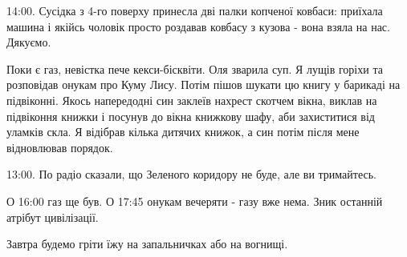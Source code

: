 14:00. Сусідка з 4-го поверху принесла дві палки копченої ковбаси: приїхала
машина і якійсь чоловік просто роздавав ковбасу з кузова - вона взяла на нас.
Дякуємо.

Поки є газ, невістка пече кекси-бісквіти. Оля зварила суп. Я лущів горіхи та
розповідав онукам про Куму Лису. Потім пішов шукати цю книгу у барикаді на
підвіконні. Якось напередодні син заклеїв нахрест скотчем вікна, виклав на
підвіконня книжки і посунув до вікна книжкову шафу, аби захиститися від уламків
скла. Я відібрав кілька дитячих книжок, а син потім після мене відновлював
порядок.

13:00. По радіо сказали, що Зеленого коридору не буде, але ви тримайтесь.

О 16:00 газ ще був. О 17:45 онукам вечеряти - газу вже нема. Зник останній
атрібут цивілізації.

Завтра будемо гріти їжу на запальничках або на вогнищі.
